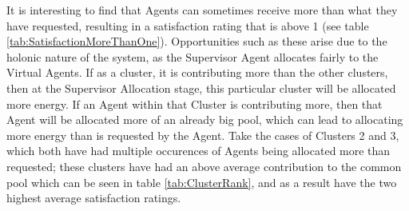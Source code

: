 It is interesting to find that Agents can sometimes receive more than what they have requested, resulting in a satisfaction rating that is above 1 (see table \ref{tab:SatisfactionMoreThanOne}). Opportunities such as these arise due to the holonic nature of the system, as the Supervisor Agent allocates fairly to the Virtual Agents. If as a cluster, it is contributing more than the other clusters, then at the Supervisor Allocation stage, this particular cluster will be allocated more energy. If an Agent within that Cluster is contributing more, then that Agent will be allocated more of an already big pool, which can lead to allocating more energy than is requested by the Agent. Take the cases of Clusters 2 and 3, which both have had multiple occurences of Agents being allocated more than requested; these clusters have had an above average contribution to the common pool which can be seen in table \ref{tab:ClusterRank}, and as a result have the two highest average satisfaction ratings. 

